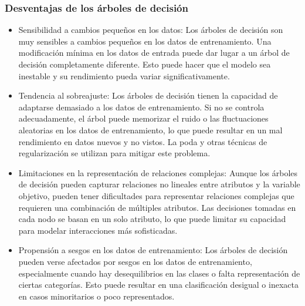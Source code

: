 \subsubsection{Desventajas de los árboles de decisión}
\begin{itemize}
    \item Sensibilidad a cambios pequeños en los datos: Los árboles de decisión son muy sensibles a cambios pequeños en los datos de entrenamiento. Una modificación mínima en los datos de entrada puede dar lugar a un árbol de decisión completamente diferente. Esto puede hacer que el modelo sea inestable y su rendimiento pueda variar significativamente.
    \item Tendencia al sobreajuste: Los árboles de decisión tienen la capacidad de adaptarse demasiado a los datos de entrenamiento. Si no se controla adecuadamente, el árbol puede memorizar el ruido o las fluctuaciones aleatorias en los datos de entrenamiento, lo que puede resultar en un mal rendimiento en datos nuevos y no vistos. La poda y otras técnicas de regularización se utilizan para mitigar este problema.
    \item Limitaciones en la representación de relaciones complejas: Aunque los árboles de decisión pueden capturar relaciones no lineales entre atributos y la variable objetivo, pueden tener dificultades para representar relaciones complejas que requieren una combinación de múltiples atributos. Las decisiones tomadas en cada nodo se basan en un solo atributo, lo que puede limitar su capacidad para modelar interacciones más sofisticadas.
    \item Propensión a sesgos en los datos de entrenamiento: Los árboles de decisión pueden verse afectados por sesgos en los datos de entrenamiento, especialmente cuando hay desequilibrios en las clases o falta representación de ciertas categorías. Esto puede resultar en una clasificación desigual o inexacta en casos minoritarios o poco representados.
\end{itemize}